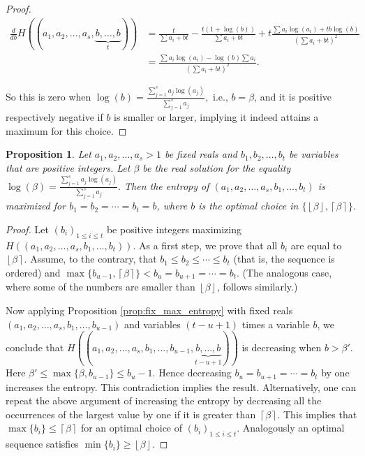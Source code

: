 \documentclass{article}
\newtheorem{prop}[defi]{Proposition}
\newcommand*{\floorceil}[1]{\left\lfloor #1\right\rceil}
\newcommand*{\bceil}[1]{\left\lceil #1\right\rceil}
\newcommand*{\bfloor}[1]{\left\lfloor #1\right\rfloor}
\def \b{\beta}
\begin{document}
{\begin{proof}
   \begin{align*}
       \frac{d}{db}H\left((a_1,a_2, \ldots, a_s,\underbrace{b, \ldots, b}_{t })\right) &=
       \frac{t}{ \sum a_i + bt}  - \frac{ t(1+ \log(b) )}{\sum a_i + bt} + t \frac{ \sum a_i \log(a_i) + tb \log(b)}{(\sum a_i + bt)^2}\\
       &= \frac{  \sum a_i \log(a_i) -  \log(b)\sum a_i}{(\sum a_i + bt)^2}.
   \end{align*}
    
    So this is zero when $\log(b) = \frac{ \sum_{j=1}^s a_j \log(a_j) }{ \sum_{j=1}^s a_j },$ i.e., $b=\b$, and it is positive respectively negative if $b$ is smaller or larger,
    implying it indeed attains a maximum for this choice.
\end{proof}





\begin{prop}\label{prop:fix_max_entropy_integers}
    Let $a_1,a_2, \ldots, a_s>1$ be fixed reals and $b_1,b_2, \ldots, b_t$ be variables that are positive integers.
    Let $\b$ be the real solution for the equality $\log(\b) = \frac{ \sum_{j=1}^s a_j \log(a_j) }{ \sum_{j=1}^s a_j }.$
    Then the entropy of $(a_1,a_2, \ldots, a_s,b_1, \ldots, b_t)$ is maximized for $b_1=b_2=\cdots=b_t=b$, where $b$ is the optimal choice in $\{ \bfloor{\b}, \bceil{\b} \}.$
\end{prop}   
    


\begin{proof}
Let $(b_i)_{1 \le i \le t}$ be positive integers maximizing $H((a_1,a_2, \ldots, a_s,b_1, \ldots, b_t)).$
As a first step, we prove that all $b_i$ are equal to $\floorceil{\b}.$
Assume, to the contrary, that $b_1 \le b_2 \le \cdots \le b_t$ (that is, the sequence is ordered) and $\max\{b_{u-1},  \bceil{\b}\} < b_u=b_{u+1}= \cdots =b_t$.
(The analogous case, where some of the numbers are smaller than $\bfloor{\b}$, follows similarly.)

Now applying Proposition \ref{prop:fix_max_entropy} with fixed reals $(a_1,a_2, \ldots, a_s,b_1, \ldots, b_{u-1})$ and variables $(t-u+1)$ times a variable $b$, we conclude that 
$H\left((a_1,a_2, \ldots, a_s,b_1, \ldots, b_{u-1},\underbrace{b, \ldots, b}_{t-u+1 } )\right)$ is decreasing when $b>\b'.$
Here $\b'\le \max\{\b, b_{u-1}\}\le b_u-1.$
Hence decreasing $b_u=b_{u+1}= \cdots =b_t$ by one increases the entropy. This contradiction implies the result.
Alternatively, one can repeat the above argument of increasing the entropy by decreasing all the occurrences of the largest value by one if it is greater than $\bceil{\b}$. This implies that $\max\{b_i\}\le \bceil{\b}$ for an optimal choice of $(b_i)_{1 \le i \le t}.$
Analogously an optimal sequence satisfies $\min\{b_i\}\ge \bfloor{\b}.$


\end{proof}}
\end{document}
